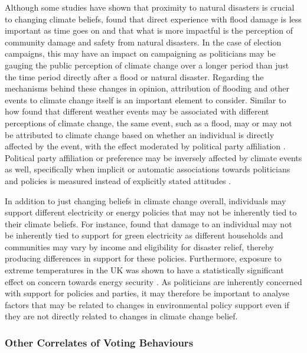 \documentclass[12pt,letterpaper]{article}
\begin{document}
Although some studies have shown that proximity to natural disasters is crucial to changing climate beliefs, \textcite{albrightBeliefsClimateChange2019} found that direct experience with flood damage is less important as time goes on and that what is more impactful is the perception of community damage and safety from natural disasters. In the case of election campaigns, this may have an impact on campaigning as politicians may be gauging the public perception of climate change over a longer period than just the time period directly after a flood or natural disaster. Regarding the mechanisms behind these changes in opinion, attribution of flooding and other events to climate change itself is an important element to consider. Similar to how \textcite{loComeRainShine2015} found that different weather events may be associated with different perceptions of climate change, the same event, such as a flood, may or may not be attributed to climate change based on whether an individual is directly affected by the event, with the effect moderated by political party affiliation \autocite{ogunbodeIndividualLocalFlooding2020}. Political party affiliation or preference may be inversely affected by climate events as well, specifically when implicit or automatic associations towards politicians and policies is measured instead of explicitly stated attitudes \autocite{rudmanWhenTruthPersonally2013a}. 

In addition to just changing beliefs in climate change overall, individuals may support different electricity or energy policies that may not be inherently tied to their climate beliefs. For instance, \textcite{osberghausCausalEffectFlood2019} found that damage to an individual may not be inherently tied to support for green electricity as different households and communities may vary by income and eligibility for disaster relief, thereby producing differences in support for these policies. Furthermore, exposure to extreme temperatures in the UK was shown to have a statistically significant effect on concern towards energy security \autocite{larcomUKSummerHeatwave2019a}. As politicians are inherently concerned with support for policies and parties, it may therefore be important to analyse factors that may be related to changes in environmental policy support even if they are not directly related to changes in climate change belief. 



\subsubsection{Other Correlates of Voting Behaviours}
\end{document}
